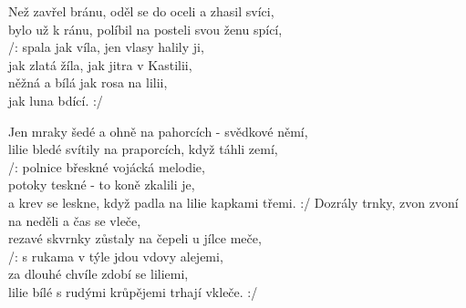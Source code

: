 \ve
{}Než zavřel bránu, oděl se do oceli  a zhasil svíci, \\
bylo už k ránu, políbil na posteli svou ženu spící, \\
/: spala jak víla, jen vlasy halily ji, \\
jak zlatá žíla, jak jitra v Kastilii, \\
něžná a bílá jak rosa na lilii, \\
 jak luna bdící. :/ 

\ve
Jen mraky šedé a ohně na pahorcích - svědkové němí, \\
lilie bledé svítily na praporcích, když táhli zemí, \\
/: polnice břeskné vojácká melodie, \\
potoky teskné - to koně zkalili je, \\
a krev se leskne, když padla na lilie kapkami třemi. :/ 
\ve
Dozrály trnky, zvon zvoní na neděli a čas se vleče, \\
rezavé skvrnky zůstaly na čepeli u jílce meče, \\
/: s rukama v týle jdou vdovy alejemi, \\
za dlouhé chvíle zdobí se liliemi, \\
lilie bílé s rudými krůpějemi trhají vkleče. :/
\esong
